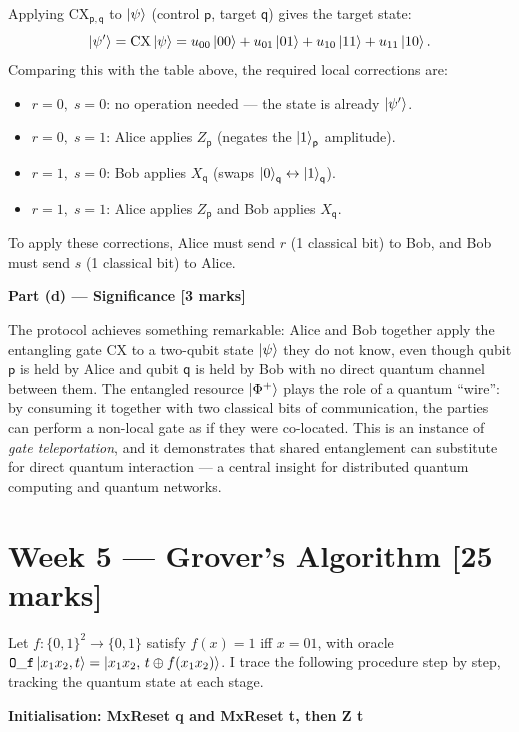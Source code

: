 \documentclass[12pt,a4paper]{article}
\begin{document}
\medskip
Applying $\mathrm{CX}_{\mathsf{p,q}}$ to $\ket{\psi}$ (control $\mathsf{p}$, target $\mathsf{q}$) gives the target state:
\[
  \ket{\psi'} = \mathrm{CX}\ket{\psi}
  = u_{00}\ket{00}+u_{01}\ket{01}+u_{10}\ket{11}+u_{11}\ket{10}.
\]
Comparing this with the table above, the required local corrections are:
\begin{itemize}
  \item $r=0,\;s=0$: no operation needed — the state is already $\ket{\psi'}$.
  \item $r=0,\;s=1$: Alice applies $Z_{\mathsf{p}}$ (negates the $\ket{1}_{\mathsf{p}}$ amplitude).
  \item $r=1,\;s=0$: Bob applies $X_{\mathsf{q}}$ (swaps $\ket{0}_{\mathsf{q}}\leftrightarrow\ket{1}_{\mathsf{q}}$).
  \item $r=1,\;s=1$: Alice applies $Z_{\mathsf{p}}$ and Bob applies $X_{\mathsf{q}}$.
\end{itemize}
To apply these corrections, Alice must send $r$ (1 classical bit) to Bob,
and Bob must send $s$ (1 classical bit) to Alice.

\medskip
\textbf{Part (d) --- Significance [3 marks]}

\medskip
The protocol achieves something remarkable: Alice and Bob together apply the entangling gate
$\mathrm{CX}$ to a two-qubit state $\ket{\psi}$ they do not know, even though qubit $\mathsf{p}$ is
held by Alice and qubit $\mathsf{q}$ is held by Bob with no direct quantum channel between them.
The entangled resource $\ket{\Phi^+}$ plays the role of a quantum ``wire'': by consuming it together
with two classical bits of communication, the parties can perform a non-local gate as if they were
co-located. This is an instance of \emph{gate teleportation}, and it demonstrates that shared
entanglement can substitute for direct quantum interaction — a central insight for distributed
quantum computing and quantum networks.

\section*{Week 5 --- Grover's Algorithm [25 marks]}

Let $f:\{0,1\}^2\to\{0,1\}$ satisfy $f(x)=1$ iff $x=01$, with oracle
$\mathtt{O\_f}\ket{x_1 x_2,t}=\ket{x_1 x_2,\,t\oplus f(x_1 x_2)}$.
I trace the following procedure step by step, tracking the quantum state at each stage.

\medskip
\textbf{Initialisation: MxReset q and MxReset t, then Z t}
\end{document}
